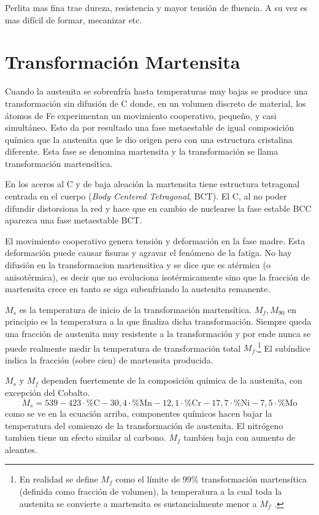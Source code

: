 \documentclass{article}
\begin{document}
Perlita mas fina trae dureza, resistencia y mayor tensión de fluencia. A su vez es mas difícil de formar, mecanizar etc.

\section{Transformación Martensita}
Cuando la austenita se sobrenfría hasta temperaturas muy bajas se produce una transformación sin difusión de C donde, en un volumen discreto de material, los átomos de Fe experimentan un movimiento cooperativo, pequeño, y casi simultáneo. Esto da por resultado una fase metaestable de igual composición química que la austenita que le dio origen pero con una estructura cristalina diferente. Esta fase se denomina martensita y la transformación se llama transformación martensítica.

En los aceros al C y de baja aleación la martensita tiene estructura tetragonal centrada en el cuerpo (\textit{Body Centered Tetragonal}, BCT). El C, al no poder difundir distorsiona la red y hace que en cambio de nuclearse la fase estable BCC aparezca una fase metaestable BCT.

El movimiento cooperativo genera tensión y deformación en la fase madre. Esta deformación puede causar fisuras y agravar el fenómeno de la fatiga. No hay difusión en la transformacion martensitica y se dice que es atérmica (o anisotérmica), es decir que no evoluciona isotérmicamente sino que la fracción de martensita crece en tanto se siga subenfriando la austenita remanente.

$M_s$ es la temperatura de inicio de la transformación martensítica. $M_f,M_{90}$ en principio es la temperatura a la que finaliza dicha transformación. Siempre queda una fracción de austenita muy resistente a la transformación y por ende nunca se puede realmente medir la temperatura de transformación total $M_f$.\footnote{En realidad se define $M_f$ como el límite de 99\% transformación martensítica (definida como fracción de volumen), la temperatura a la cual toda la austenita se convierte a martensita es sustancialmente menor a $M_f$ \cite{gottstein2013physical}.} El subíndice indica la fracción (sobre cien) de martensita producida.

$M_s$ y $M_f$ dependen fuertemente de la composición química de la austenita, con excepción del Cobalto.
\begin{equation}
    M_s=539-423\cdot \% \mathrm{C}-30,4\cdot \% \mathrm{M n}-12,1\cdot \% \mathrm{Cr}-17,7\cdot \% \mathrm{Ni}-7,5\cdot \% \mathrm{Mo}
\end{equation}
como se ve en la ecuación arriba, componentes químicos hacen bajar la temperatura del comienzo de la transformación de austenita. El nitrógeno tambien tiene un efecto similar al carbono. $M_f$ tambien baja con aumento de aleantes.
\end{document}
